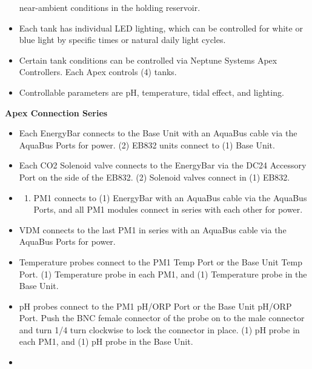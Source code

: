 \documentclass[]{book}
\providecommand{\tightlist}{%
  \setlength{\itemsep}{0pt}\setlength{\parskip}{0pt}}
\begin{document}
\begin{itemize}
  near-ambient conditions in the holding reservoir.\\
\item
  Each tank has individual LED lighting, which can be controlled for
  white or blue light by specific times or natural daily light cycles.\\
\item
  Certain tank conditions can be controlled via Neptune Systems Apex
  Controllers. Each Apex controls (4) tanks.\\
\item
  Controllable parameters are pH, temperature, tidal effect, and
  lighting.
\end{itemize}

 \textbf{Apex Connection Series}

\begin{itemize}
\item
  Each EnergyBar connects to the Base Unit with an AquaBus cable via the
  AquaBus Ports for power. (2) EB832 units connect to (1) Base Unit.\\
\item
  Each CO2 Solenoid valve connects to the EnergyBar via the DC24
  Accessory Port on the side of the EB832. (2) Solenoid valves connect
  in (1) EB832.\\
\item
  \begin{enumerate}
  \def\labelenumi{(\arabic{enumi})}
  \tightlist
  \item
    PM1 connects to (1) EnergyBar with an AquaBus cable via the AquaBus
    Ports, and all PM1 modules connect in series with each other for
    power.\\
  \end{enumerate}
\item
  VDM connects to the last PM1 in series with an AquaBus cable via the
  AquaBus Ports for power.\\
\item
  Temperature probes connect to the PM1 Temp Port or the Base Unit Temp
  Port. (1) Temperature probe in each PM1, and (1) Temperature probe in
  the Base Unit.\\
\item
  pH probes connect to the PM1 pH/ORP Port or the Base Unit pH/ORP Port.
  Push the BNC female connector of the probe on to the male connector
  and turn 1/4 turn clockwise to lock the connector in place. (1) pH
  probe in each PM1, and (1) pH probe in the Base Unit.\\
\item

\end{itemize}
\end{document}
